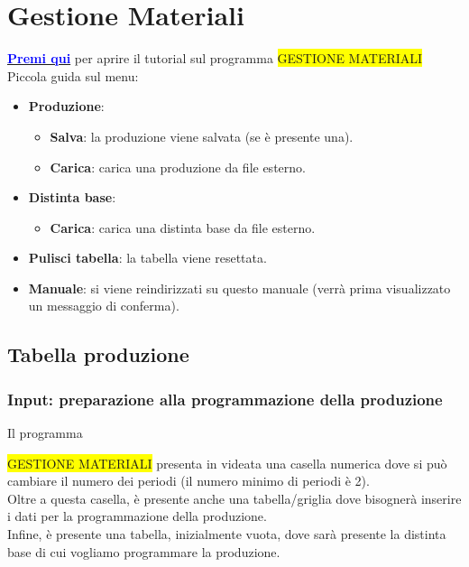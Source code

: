 \documentclass[12pt,twoside]{report}
\newcommand{\coloredbold}[2]{\textcolor{#1}{\textbf{#2}}}
\begin{document}
\chapter{Gestione Materiali}

\href{https://drive.google.com/file/d/1kBvDtx1MlKc4LtRRRGeZtYbrp9oTocNf/view?usp=sharing}{\coloredbold{blue}{Premi qui}} per aprire il tutorial sul programma \colorbox{yellow}{GESTIONE MATERIALI}\\

Piccola guida sul menu:
\begin{itemize}

	\item \textbf{Produzione}:
	
	\begin{itemize}
		\item \textbf{Salva}: la produzione viene salvata (se è presente una).
		\item \textbf{Carica}: carica una produzione da file esterno.
	\end{itemize}

	\item \textbf{Distinta base}:
	
	\begin{itemize}
		\item \textbf{Carica}: carica una distinta base da file esterno.
	\end{itemize}

	\item \textbf{Pulisci tabella}: la tabella viene resettata.
	\item \textbf{Manuale}: si viene reindirizzati su questo manuale (verrà prima visualizzato un messaggio di conferma).

\end{itemize}


\section{Tabella produzione}

\subsection{Input: preparazione alla programmazione della produzione}

\hypertarget{inputProduzione}{Il programma} \colorbox{yellow}{GESTIONE MATERIALI} presenta in videata una casella numerica dove si può cambiare il numero dei periodi (il numero minimo di periodi è 2).\\
Oltre a questa casella, è presente anche una tabella/griglia dove bisognerà inserire i dati per la programmazione della produzione.\\
Infine, è presente una tabella, inizialmente vuota, dove sarà presente la distinta base di cui vogliamo programmare la produzione.\\
\end{document}
